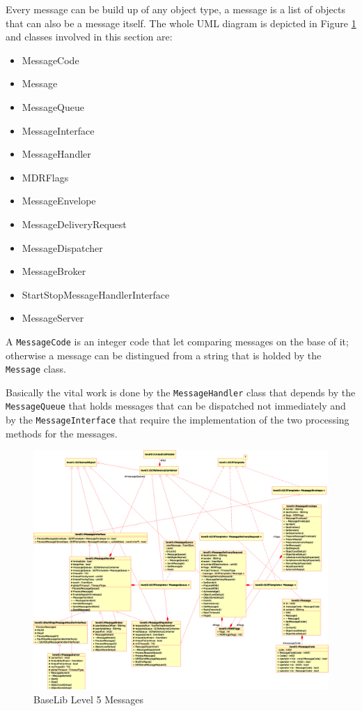 Every message can be build up of any object type, a message is a list of objects that can also be a message itself. The whole UML diagram is depicted in Figure \ref{f:level5:MSG} and classes involved in this section are:
\begin{itemize}
 \item MessageCode
 \item Message

 \item MessageQueue
 \item MessageInterface
 \item MessageHandler

 \item MDRFlags
 \item MessageEnvelope
 \item MessageDeliveryRequest

 \item MessageDispatcher
 \item MessageBroker
 \item StartStopMessageHandlerInterface
 \item MessageServer
\end{itemize}

A \texttt{MessageCode} is an integer code that let comparing messages on the base of it; otherwise a message can be distingued from a string that is holded by the \texttt{Message} class.

Basically the vital work is done by the \texttt{MessageHandler} class that depends by the \texttt{MessageQueue} that holds messages that can be dispatched not immediately and by the \texttt{MessageInterface} that require the implementation of the two processing methods for the messages. \\
\begin{figure}[h!]
 \begin{center}
  \includegraphics[width=1.1\textwidth]{level5/level5-MSG-exp.eps} 
  \caption{BaseLib Level 5 Messages}
  \label{f:level5:MSG}
 \end{center}
\end{figure}

